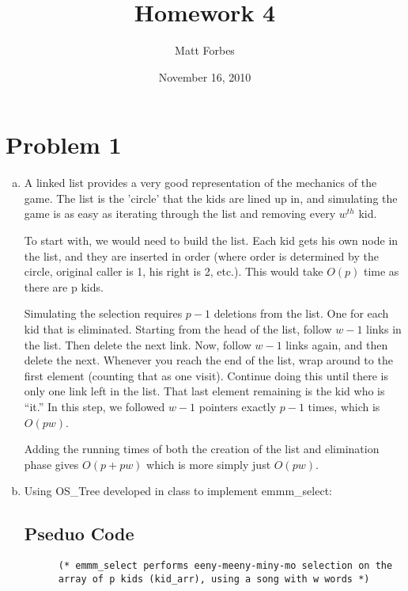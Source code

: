 \documentclass[a4paper,12pt]{article}
\begin{document}
\title{Homework 4}
\author{Matt Forbes}
\date{November 16, 2010}
\maketitle

\section*{Problem 1}


\begin{enumerate}[a)]
  \item

    A linked list provides a very good representation of the mechanics
    of the game. The list is the 'circle' that the kids are lined up
    in, and simulating the game is as easy as iterating through the
    list and removing every $w^{th}$ kid.

    
    To start with, we would need to build the list. Each kid gets his
    own node in the list, and they are inserted in order (where order
    is determined by the circle, original caller is 1, his right is 2,
    etc.). This would take $O(p)$ time as there are p kids.

    
    Simulating the selection requires $p-1$ deletions from the
    list. One for each kid that is eliminated. Starting from the head
    of the list, follow $w-1$ links in the list. Then delete the next
    link. Now, follow $w-1$ links again, and then delete the
    next. Whenever you reach the end of the list, wrap around to the
    first element (counting that as one visit). Continue doing this
    until there is only one link left in the list. That last element
    remaining is the kid who is ``it.'' In this step, we followed
    $w-1$ pointers exactly $p-1$ times, which is $O(pw)$.

    
    Adding the running times of both the creation of the list and
    elimination phase gives $O(p + pw)$ which is more simply just
    $O(pw)$. 

  \item Using OS\_Tree developed in class to implement emmm\_select:
    
\subsection*{Pseduo Code}

    \begin{verbatim}
      (* emmm_select performs eeny-meeny-miny-mo selection on the 
      array of p kids (kid_arr), using a song with w words *)


\end{verbatim}
\end{enumerate}
\end{document}
